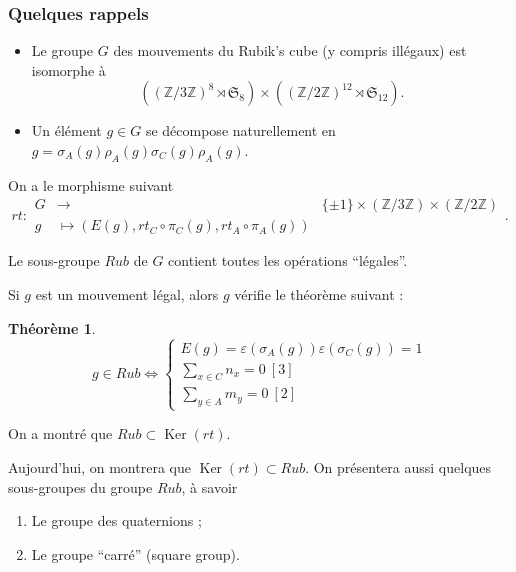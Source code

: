 \documentclass[10pt,notheorems]{beamer}
\theoremstyle{plain}
\newtheorem{theorem}{Théorème}[section]
\theoremstyle{definition}
\theoremstyle{plain}
\theoremstyle{plain}
\theoremstyle{plain}
\theoremstyle{remark}
\begin{document}
\begin{frame}
  \frametitle{Quelques rappels}
  \begin{itemize}
    \item Le groupe $G$ des mouvements du Rubik's cube (y compris illégaux) est isomorphe à $$ ((\mathbb{Z}/{ 3 }\mathbb{Z}) ^{8} \rtimes \mathfrak{S}_{8} ) \times ((\mathbb{Z}/{ 2 }\mathbb{Z}) ^{12} \rtimes \mathfrak{S}_{12} ).$$
    \item Un élément $g \in G$ se décompose naturellement en $g = \sigma_A(g) \rho_A(g) \sigma_C(g) \rho_A(g)$.
  \end{itemize}
On a le morphisme suivant
  \begin{equation*}
 rt :
  \begin{array}{lll}
  G & \longrightarrow & \{ \pm 1 \} \times (\mathbb{Z}/{ 3 }\mathbb{Z}) \times (\mathbb{Z}/{ 2 }\mathbb{Z}) \\
  g & \longmapsto (E (g), rt_C \circ \pi_C(g), rt_A \circ \pi_A(g))
  \end{array}.
 \end{equation*}

  Le sous-groupe $Rub$ de $G$ contient toutes les opérations ``légales''.

\end{frame}

\begin{frame}
  Si $g$ est un mouvement légal, alors $g$ vérifie le théorème suivant :

   \begin{theorem}

     $$ g \in Rub \iff \left \lbrace \begin{matrix}
     E (g) = \varepsilon (\sigma_A(g)) \varepsilon (\sigma_C(g))=1 \\
     \sum_{x \in C} n_x = 0 \ [3] \\
     \sum_{y \in A} m_y = 0 \ [2]
     \end{matrix} \right.$$
   \end{theorem}

   On a montré que $Rub \subset \operatorname{Ker}(rt)$.

   Aujourd'hui, on montrera que $\operatorname{Ker}(rt) \subset Rub$. On présentera aussi quelques sous-groupes du groupe $Rub$, à savoir
   \begin{enumerate}
     \item Le groupe des quaternions ;
     \item Le groupe ``carré'' (square group).
   \end{enumerate}
\end{frame}
\end{document}

